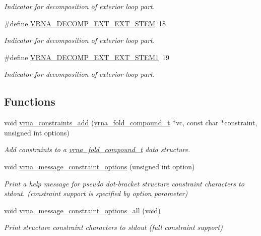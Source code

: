\begin{DoxyCompactItemize}
\begin{DoxyCompactList}\small\item\em Indicator for decomposition of exterior loop part. \end{DoxyCompactList}\item 
\#define \hyperlink{group__constraints_ga06efd054c9271438f6d82d4559d9e69f}{V\+R\+N\+A\+\_\+\+D\+E\+C\+O\+M\+P\+\_\+\+E\+X\+T\+\_\+\+E\+X\+T\+\_\+\+S\+T\+E\+M}~18
\begin{DoxyCompactList}\small\item\em Indicator for decomposition of exterior loop part. \end{DoxyCompactList}\item 
\#define \hyperlink{group__constraints_ga2e75d7a77118735b32f25422d9686719}{V\+R\+N\+A\+\_\+\+D\+E\+C\+O\+M\+P\+\_\+\+E\+X\+T\+\_\+\+E\+X\+T\+\_\+\+S\+T\+E\+M1}~19
\begin{DoxyCompactList}\small\item\em Indicator for decomposition of exterior loop part. \end{DoxyCompactList}\end{DoxyCompactItemize}
\subsection*{Functions}
\begin{DoxyCompactItemize}
\item 
void \hyperlink{group__constraints_ga35a401f680969a556858a8dd5f1d07cc}{vrna\+\_\+constraints\+\_\+add} (\hyperlink{group__fold__compound_ga1b0cef17fd40466cef5968eaeeff6166}{vrna\+\_\+fold\+\_\+compound\+\_\+t} $\ast$vc, const char $\ast$constraint, unsigned int options)
\begin{DoxyCompactList}\small\item\em Add constraints to a \hyperlink{group__fold__compound_ga1b0cef17fd40466cef5968eaeeff6166}{vrna\+\_\+fold\+\_\+compound\+\_\+t} data structure. \end{DoxyCompactList}\item 
void \hyperlink{group__constraints_gaa1f20b53bf09ac2e6b0dbb13f7d89670}{vrna\+\_\+message\+\_\+constraint\+\_\+options} (unsigned int option)
\begin{DoxyCompactList}\small\item\em Print a help message for pseudo dot-\/bracket structure constraint characters to stdout. (constraint support is specified by option parameter) \end{DoxyCompactList}\item 
void \hyperlink{group__constraints_gaec7e13fa0465c2acc7a621d1aecb709f}{vrna\+\_\+message\+\_\+constraint\+\_\+options\+\_\+all} (void)
\begin{DoxyCompactList}\small\item\em Print structure constraint characters to stdout (full constraint support) \end{DoxyCompactList}\end{DoxyCompactItemize}


